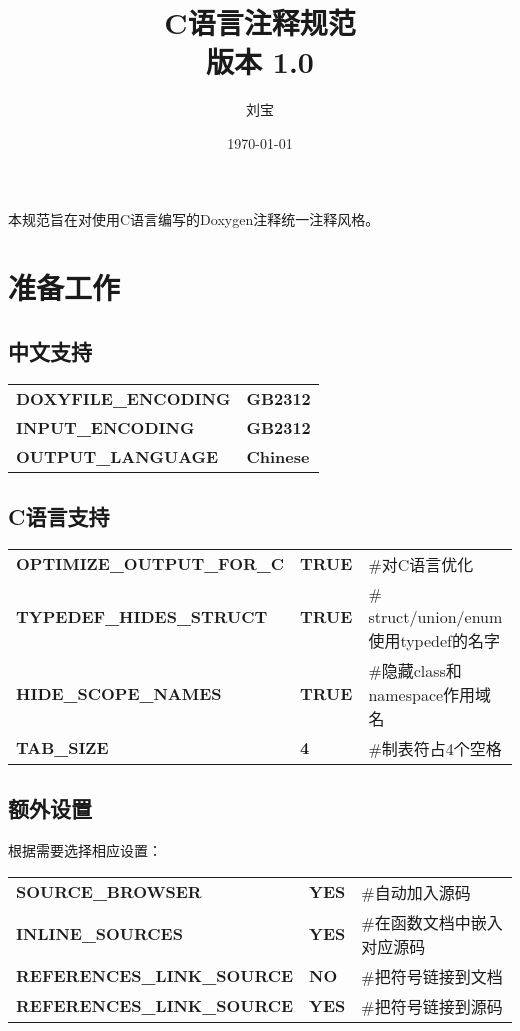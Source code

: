\documentclass[11pt,a4paper]{article}
\begin{document}
\title{\bf C语言注释规范\\[10pt]\normalsize 版本 1.0}
\author{刘宝}
\date{\today}
\maketitle
本规范旨在对使用C语言编写的Doxygen注释统一注释风格。
\section{准备工作}
\subsection{中文支持}
\begin{center}
\begin{tabular}{l @{ = } l}
\textbf{DOXYFILE\_ENCODING} & \textbf{GB2312}\\
\textbf{INPUT\_ENCODING} & \textbf{GB2312}\\
\textbf{OUTPUT\_LANGUAGE} & \textbf{Chinese}
\end{tabular}
\end{center}
\subsection{C语言支持}
\begin{center}
\begin{tabular}{l @{ = } l l}
\textbf{OPTIMIZE\_OUTPUT\_FOR\_C} & \textbf{TRUE} & \#对C语言优化\\
\textbf{TYPEDEF\_HIDES\_STRUCT} & \textbf{TRUE} & \# struct/union/enum 使用typedef的名字\\
\textbf{HIDE\_SCOPE\_NAMES} & \textbf{TRUE} & \#隐藏class和namespace作用域名\\
\textbf{TAB\_SIZE} & \textbf{4} & \#制表符占4个空格
\end{tabular}
\end{center}
\subsection{额外设置}
根据需要选择相应设置：\par
\begin{center}
\begin{tabular}{l @{ = } l l}
\textbf{SOURCE\_BROWSER} & \textbf{YES} & \#自动加入源码\\
\textbf{INLINE\_SOURCES} & \textbf{YES} & \#在函数文档中嵌入对应源码\\
\textbf{REFERENCES\_LINK\_SOURCE} & \textbf{NO} & \#把符号链接到文档\\
\textbf{REFERENCES\_LINK\_SOURCE} & \textbf{YES} & \#把符号链接到源码
\end{tabular}
\end{center}
\end{document}
